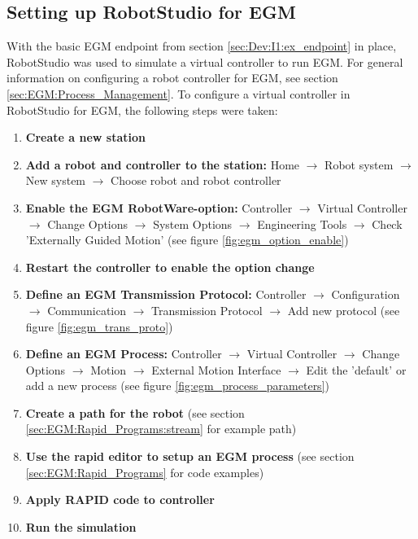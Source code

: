 \documentclass{cslthse-msc}
\begin{document}
\subsection{Setting up RobotStudio for EGM}
\label{sec:Dev:I1:RobotStudio_setup}
With the basic EGM endpoint from section \ref{sec:Dev:I1:ex_endpoint} in place, RobotStudio was used to simulate a virtual controller to run EGM. For general information on configuring a robot controller for EGM, see section \ref{sec:EGM:Process_Management}. To configure a virtual controller in RobotStudio for EGM, the following steps were taken:
\begin{enumerate}
    \item \textbf{Create a new station}
    \item \textbf{Add a robot and controller to the station:} Home $\rightarrow$ Robot system $\rightarrow$ New system $\rightarrow$ Choose robot and robot controller
    \item \textbf{Enable the EGM RobotWare-option:} Controller $\rightarrow$ Virtual Controller $\rightarrow$ Change Options $\rightarrow$ System Options $\rightarrow$ Engineering Tools $\rightarrow$ Check 'Externally Guided Motion' (see figure \ref{fig:egm_option_enable})
    \item \textbf{Restart the controller to enable the option change}
    \item \textbf{Define an EGM Transmission Protocol:} Controller $\rightarrow$ Configuration $\rightarrow$ Communication $\rightarrow$ Transmission Protocol $\rightarrow$ Add new protocol (see figure \ref{fig:egm_trans_proto})
    \item \textbf{Define an EGM Process:} Controller $\rightarrow$ Virtual Controller $\rightarrow$ Change Options $\rightarrow$ Motion $\rightarrow$ External Motion Interface $\rightarrow$ Edit the 'default' or add a new process (see figure \ref{fig:egm_process_parameters})
    \item \textbf{Create a path for the robot} (see section \ref{sec:EGM:Rapid_Programs:stream} for example path)
    \item \textbf{Use the rapid editor to setup an EGM process} (see section \ref{sec:EGM:Rapid_Programs} for code examples)
        
    \item \textbf{Apply RAPID code to controller}
    \item \textbf{Run the simulation}
\end{enumerate}
\end{document}
